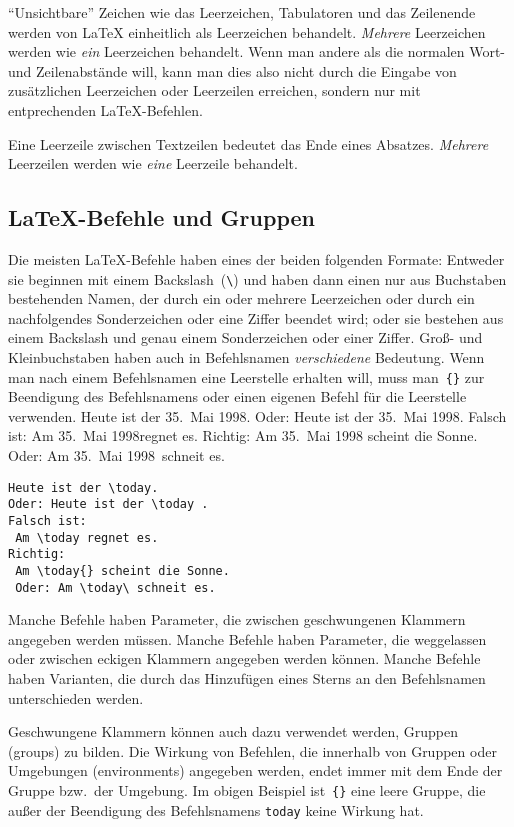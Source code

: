 "`Unsichtbare"' Zeichen wie das Leerzeichen, Tabulatoren
und das Zeilenende werden von \LaTeX{}
einheitlich als Leerzeichen behandelt.  \emph{Mehrere}
Leerzeichen werden wie \emph{ein} Leerzeichen behandelt.   
Wenn man andere als die normalen Wort- und Zeilenabstände
will, kann man dies also nicht durch die Eingabe von
zusätzlichen Leerzeichen oder Leerzeilen erreichen, sondern
nur mit entprechenden \LaTeX-Befehlen.

Eine Leerzeile zwischen Textzeilen bedeutet das Ende eines 
Absatzes.  \emph{Mehrere} Leerzeilen werden wie \emph{eine}
Leerzeile behandelt.
 
 
\subsection{\LaTeX-Befehle und Gruppen}
 
Die meisten \LaTeX-Befehle haben eines der beiden folgenden
Formate: Entweder sie beginnen mit einem Backslash~(\verb|\|)
und haben dann einen nur aus Buchstaben bestehenden Namen, der
durch ein oder mehrere Leerzeichen oder durch ein nachfolgendes
Sonderzeichen oder eine Ziffer beendet wird; oder sie bestehen
aus einem Backslash und genau einem Sonderzeichen oder einer
Ziffer.
Groß- und Kleinbuchstaben haben auch in Befehlsnamen
\emph{verschiedene} Bedeutung.
Wenn man nach einem Befehlsnamen eine Leerstelle erhalten will,
muss man~\verb|{}| zur Beendigung des Befehlsnamens oder einen
eigenen Befehl für die Leerstelle verwenden.
\exa
  \renewcommand{\today}{35.~Mai 1998}  %
Heute ist der \today.
Oder: Heute ist der \today .
Falsch ist: Am \today regnet es.
Richtig: Am \today{} scheint die Sonne.
Oder: Am \today\ schneit es.
\exb
\begin{verbatim}
Heute ist der \today.
Oder: Heute ist der \today .
Falsch ist:
 Am \today regnet es.
Richtig:
 Am \today{} scheint die Sonne.
 Oder: Am \today\ schneit es.
\end{verbatim}
\exc
 
Manche Befehle haben Parameter, die zwischen geschwungenen
Klammern angegeben werden müssen.
Manche Befehle haben Parameter, die weggelassen oder zwischen
eckigen Klammern angegeben werden können.
Manche Befehle haben Varianten, die durch das Hinzufügen
eines Sterns an den Befehlsnamen unterschieden werden.

Geschwungene Klammern können auch dazu verwendet werden, Gruppen
(groups) zu bilden.
Die Wirkung von Befehlen, die innerhalb von Gruppen oder
Umgebungen (environments) angegeben werden, endet immer mit dem
Ende der Gruppe bzw.\ der Umgebung.  Im obigen Beispiel
ist~\verb|{}| eine leere Gruppe, die außer der Beendigung des
Befehlsnamens \texttt{today} keine Wirkung hat.
 
